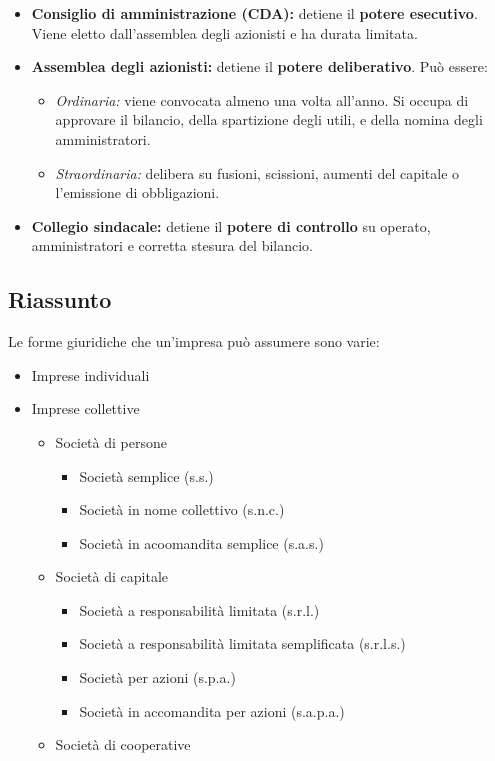 \documentclass[../main.tex]{subfiles}
\begin{document}
\begin{itemize}
\item \textbf{Consiglio di amministrazione (CDA):} detiene il \textbf{potere esecutivo}. Viene eletto dall'assemblea degli azionisti e ha durata limitata.
\item \textbf{Assemblea degli azionisti:} detiene il \textbf{potere deliberativo}. Può essere:
	\begin{itemize}
	\item \emph{Ordinaria:} viene convocata almeno una volta all'anno. Si occupa di approvare il bilancio, della spartizione degli utili, e della nomina degli amministratori.
	
	\item \emph{Straordinaria:} delibera su fusioni, scissioni, aumenti del capitale o l'emissione di obbligazioni.
	
	\end{itemize}
\item \textbf{Collegio sindacale:} detiene il \textbf{potere di controllo} su operato, amministratori e corretta stesura del bilancio.
\end{itemize}


\subsection{Riassunto}

Le forme giuridiche che un'impresa può assumere sono varie:

\begin{itemize}
\item Imprese individuali
	
\item Imprese collettive
	\begin{itemize}
	\item Società di persone
		\begin{itemize}
		\item Società semplice (s.s.)		
		\item Società in nome collettivo (s.n.c.)		
		\item Società in acoomandita semplice (s.a.s.)		
		\end{itemize}
	
	\item Società di capitale
		\begin{itemize}
		\item Società a responsabilità limitata (s.r.l.)		
		\item Società a responsabilità limitata semplificata (s.r.l.s.)
		\item Società per azioni (s.p.a.)
		\item Società in accomandita per azioni (s.a.p.a.)
		\end{itemize}
	
	\item Società di cooperative
	
	\end{itemize}
\end{itemize}
\end{document}
